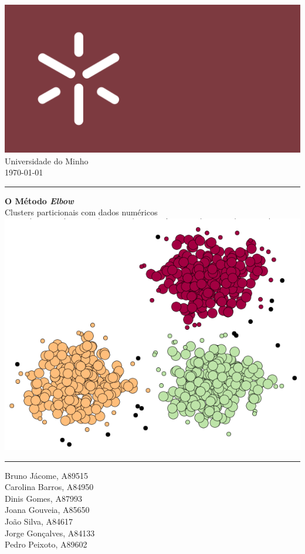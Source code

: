 \documentclass[12pt, a4paper, oneside]{scrreport}
\begin{document}
\selectfont %

\clearpairofpagestyles




\begin{flushleft}
\includegraphics[scale = 0.075]{Minho_University.png}
 \large{\\Universidade do Minho\\\normalsize{\today}}
\end{flushleft}
\rule{\textwidth}{0.5pt}
\begin{flushright}
\Huge{\textbf{O Método \textit{Elbow}}} \\ {\Large Clusters particionais com dados numéricos}
\includegraphics[scale = 0.55]{Cluster-Segmentation.png}
\end{flushright}

\begin{center}
\rule{\textwidth}{0.5pt}
\end{center}
\begin{multicols*}{2}
\noindent
\large Bruno Jácome, A89515\\
  Carolina Barros, A84950\\
  Dinis Gomes, A87993\\
  Joana Gouveia, A85650\columnbreak
  \\João Silva, A84617\\
  Jorge Gonçalves, A84133\\
  Pedro Peixoto, A89602
\end{multicols*}
\end{document}
